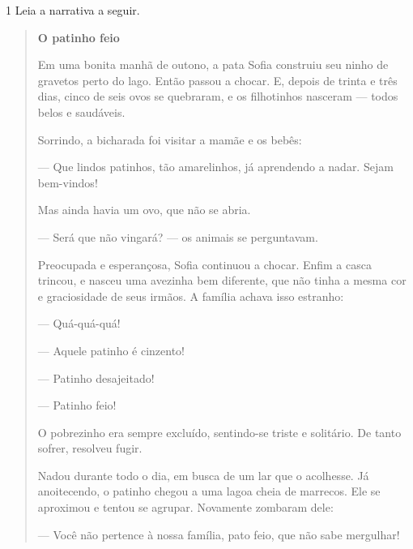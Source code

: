\begin{escolha}
\begin{escolha}

\num{1} Leia a narrativa a seguir.



\begin{quote}
\textbf{O patinho feio}

Em uma bonita manhã de outono, a pata Sofia construiu seu ninho de
gravetos perto do lago. Então passou a chocar. E, depois de trinta e
três dias, cinco de seis ovos se quebraram, e os filhotinhos nasceram
--- todos belos e saudáveis.

Sorrindo, a bicharada foi visitar a mamãe e os bebês:

--- Que lindos patinhos, tão amarelinhos, já aprendendo a nadar. Sejam
bem-vindos!

Mas ainda havia um ovo, que não se abria.

--- Será que não vingará? --- os animais se perguntavam.

Preocupada e esperançosa, Sofia continuou a chocar. Enfim a casca
trincou, e nasceu uma avezinha bem diferente, que não tinha a mesma cor
e graciosidade de seus irmãos. A família achava isso estranho:

--- Quá-quá-quá!

--- Aquele patinho é cinzento!

--- Patinho desajeitado!

--- Patinho feio!

O pobrezinho era sempre excluído, sentindo-se triste e solitário. De
tanto sofrer, resolveu fugir.

Nadou durante todo o dia, em busca de um lar que o acolhesse. Já
anoitecendo, o patinho chegou a uma lagoa cheia de marrecos. Ele se
aproximou e tentou se agrupar. Novamente zombaram dele:

--- Você não pertence à nossa família, pato feio, que não sabe
mergulhar!


\end{quote}
\end{escolha}
\end{escolha}
